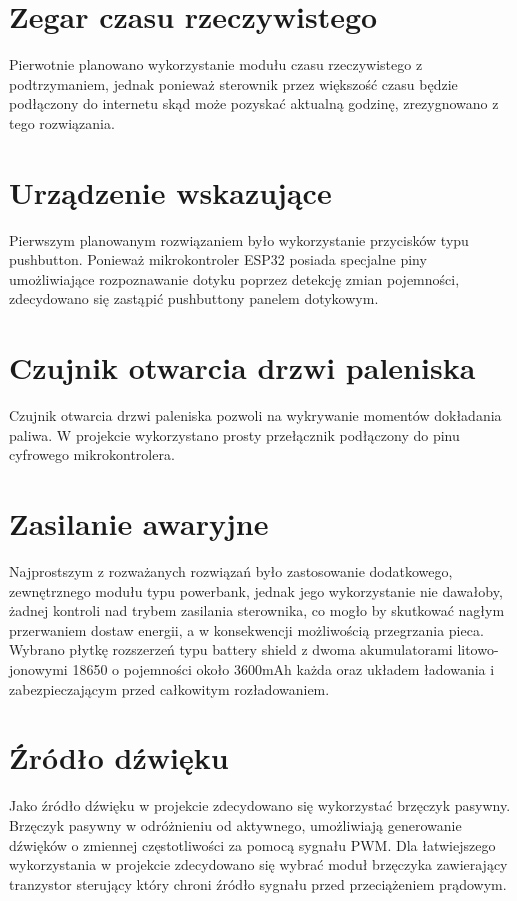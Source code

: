 \documentclass[11pt]{report}
\begin{document}
 \section{Zegar czasu rzeczywistego}
 Pierwotnie planowano wykorzystanie modułu czasu rzeczywistego z podtrzymaniem, jednak ponieważ sterownik przez większość czasu będzie podłączony do internetu skąd może pozyskać aktualną godzinę, zrezygnowano z tego rozwiązania.
 
 \section{Urządzenie wskazujące}
 Pierwszym planowanym rozwiązaniem było wykorzystanie przycisków typu pushbutton. Ponieważ mikrokontroler ESP32 posiada specjalne piny umożliwiające rozpoznawanie dotyku poprzez detekcję zmian pojemności, zdecydowano się zastąpić pushbuttony panelem dotykowym.
 
 \section{Czujnik otwarcia drzwi paleniska}
 Czujnik otwarcia drzwi paleniska pozwoli na wykrywanie momentów dokładania paliwa. W projekcie wykorzystano prosty przełącznik podłączony do pinu cyfrowego mikrokontrolera.
 
 \section{Zasilanie awaryjne}
 Najprostszym z rozważanych rozwiązań było zastosowanie dodatkowego, zewnętrznego modułu typu powerbank, jednak jego wykorzystanie nie dawałoby, żadnej kontroli nad trybem zasilania sterownika, co mogło by skutkować nagłym przerwaniem dostaw energii, a w konsekwencji możliwością przegrzania pieca. Wybrano płytkę rozszerzeń typu battery shield z dwoma akumulatorami litowo-jonowymi 18650 o pojemności około 3600mAh każda oraz układem ładowania i zabezpieczającym przed całkowitym rozładowaniem.
 
 \section{Źródło dźwięku}
 Jako źródło dźwięku w projekcie zdecydowano się wykorzystać brzęczyk pasywny. Brzęczyk pasywny w odróżnieniu od aktywnego, umożliwiają generowanie dźwięków o zmiennej częstotliwości za pomocą sygnału PWM. Dla łatwiejszego wykorzystania w projekcie zdecydowano się wybrać moduł brzęczyka zawierający tranzystor sterujący który chroni źródło sygnału przed przeciążeniem prądowym.
 
\end{document}
